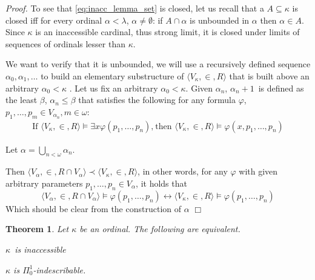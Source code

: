 \documentclass[12pt,a4paper]{article}
\newtheorem{theorem}{Theorem}[section]
\newenvironment{proof}
{\noindent \textit{Proof.}}
{\hspace*{\fill} $\Box$}
\renewcommand{\iff}{\leftrightarrow}
\newcommand{\bce}{\begin{compactenum}}
\newcommand{\ece}{\end{compactenum}}
\begin{document}
\begin{proof}
To see that \ref{eq:inacc_lemma_set} is closed, let us recall that a $A \subseteq \kappa$ is closed iff for every ordinal $\alpha < \lambda$, $\alpha \neq \emptyset$: if $A \cap \alpha$ is unbounded in $\alpha$ then $\alpha \in A$. Since $\kappa$ is an inaccessible cardinal, thus strong limit, it is closed under limits of sequences of ordinals lesser than $\kappa$.  


We want to verify that it is unbounded, we will use a recursively defined sequence $\alpha_0, \alpha_1, \ldots$
to build an elementary substructure of $\langle V_\kappa, \in, R \rangle$ that is built above an arbitrary $\alpha_0 <\kappa$ .
Let us fix an arbitrary $\alpha_0 < \kappa$. Given $\alpha_n$, $\alpha_n+1$ is defined as the least $\beta$, $\alpha_n \leq \beta$ that satisfies 
the following for any formula $\varphi$, $p_1, \ldots, p_m \in V_{\alpha_{n}}, m \in \omega$:
\begin{equation}
\begin{gathered}
\mbox{If }\langle V_\kappa, \in, R \rangle \models \exists x \varphi(p_1, \ldots, p_n)\mbox{,}\
\mbox{then }\langle V_\kappa, \in, R \rangle \models \varphi(x, p_1, \ldots, p_n)
\end{gathered}
\end{equation}

Let $\alpha = \bigcup_{n < \omega} \alpha_n$. 

Then $\langle V_\alpha, \in, R \cap V_\alpha \rangle \prec \langle V_\kappa, \in, R \rangle$, in other words, for any $\varphi$ with given arbitrary parameters $p_1, \ldots, p_n \in V_\alpha$, it holds that
\begin{equation}
\langle V_\alpha, \in, R \cap V_\alpha \rangle \models \varphi(p_1, \ldots, p_n) \iff \langle V_\kappa, \in, R \rangle \models \varphi(p_1, \ldots, p_n)
\end{equation}
Which should be clear from the construction of $\alpha$
\end{proof}

\begin{theorem}
Let $\kappa$ be an ordinal. The following are equivalent.
\bce[(i)]
\item $\kappa$ is inaccessible
\item $\kappa$ is $\Pi^1_0$-indescribable.
\ece
\end{theorem}
\end{document}
